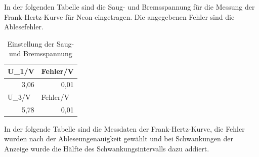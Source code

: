 \documentclass[12pt,a4paper]{article}
\begin{document}
In der folgenden Tabelle sind die Saug- und Bremsspannung für die Messung der Frank-Hertz-Kurve für Neon eingetragen. Die angegebenen Fehler sind die Ablesefehler.

\begin{table}[htbp]
\caption{Einstellung der Saug- und Bremsspannung}
\begin{center}
\begin{tabular}{|l|l|}
\hline
U\_1/V & Fehler/V \\ \hline
\multicolumn{1}{|r|}{3,06} & \multicolumn{1}{r|}{0,01} \\ \hline
U\_3/V & Fehler/V \\ \hline
\multicolumn{1}{|r|}{5,78} & \multicolumn{1}{r|}{0,01} \\ \hline
\end{tabular}
\end{center}
\label{tab:material}
\end{table}


In der folgende Tabelle sind die Messdaten der Frank-Hertz-Kurve, die Fehler wurden nach der Ableseungenauigkeit gewählt und bei Schwankungen der Anzeige wurde die Hälfte des Schwankungsintervalls dazu addiert.
\end{document}
